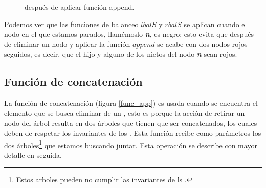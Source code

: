 \begin{figure}
\centering
\captionsetup{justification=centering}
\caption{{\Arn} después de aplicar función append.}
\label{arbolRB_6}
\end{figure}

Podemos ver que las funciones de balanceo $lbalS$ y $rbalS$ se aplican cuando el nodo en el que
estamos parados, llamémoslo \textbf{\textit{n}}, es negro; esto evita que después de eliminar un nodo y aplicar la
funci\'on $append$ se acabe con dos nodos rojos seguidos, es decir, que el hijo y alguno de los
nietos del nodo \textbf{\textit{n}} sean rojos.

\subsection{Funci\'on de concatenaci\'on}

La funci\'on de concatenación (figura \ref{func_app}) es usada cuando se encuentra el elemento que
se busca eliminar de un {\arn}, esto es porque la acci\'on de retirar un nodo del \'arbol resulta
en dos \'arboles que tienen que ser concatenados, los cuales deben de respetar los invariantes de
los {\arns}. Esta funci\'on recibe como parámetros los dos \'arboles\footnote{Estos arboles pueden
no cumplir las invariantes de ls {\arns}.} que estamos buscando juntar. Esta operación se describe
con mayor detalle en seguida.

